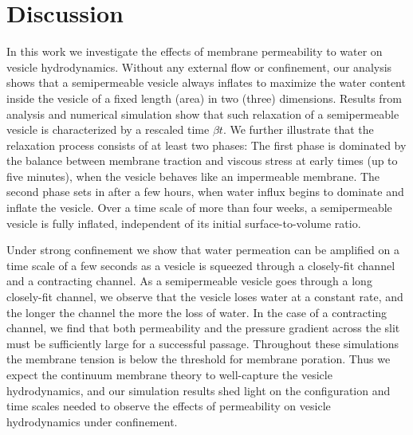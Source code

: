 \documentclass[prb,preprint,showpacs,preprintnumbers,amsmath,amssymb,longbibliography]{revtex4-1}
\begin{document}
\section{Discussion}
In this work we investigate the effects of membrane permeability to
water on vesicle hydrodynamics. Without any external flow or
confinement, our analysis shows that a semipermeable vesicle always
inflates to maximize the water content inside the vesicle of a fixed
length (area) in two (three) dimensions. Results from analysis and
numerical simulation show that such relaxation of a semipermeable
vesicle is characterized by a rescaled time $\beta t$. We further
illustrate that the relaxation process consists of at least two phases:
The first phase is dominated by the balance between membrane traction
and viscous stress at early times (up to five minutes), when the vesicle
behaves like an impermeable membrane. The second phase sets in after a
few hours, when water influx begins to dominate and inflate the vesicle.
Over a time scale of more than four weeks, a semipermeable vesicle is
fully inflated, independent of its initial surface-to-volume ratio.

Under strong confinement we show that water permeation can be amplified
on a time scale of a few seconds as a vesicle is squeezed through a
closely-fit channel and a contracting channel. As a semipermeable
vesicle goes through a long closely-fit channel, we observe that the
vesicle loses water at a constant rate, and the longer the channel the
more the loss of water. In the case of a contracting channel, we find
that both permeability and the pressure gradient across the slit must be
sufficiently large for a successful passage. Throughout these
simulations the membrane tension is below the threshold for membrane
poration. Thus we expect the continuum membrane theory to well-capture
the vesicle hydrodynamics, and our simulation results shed light on the
configuration and time scales needed to observe the effects of
permeability on vesicle hydrodynamics under confinement. 

\end{document}
